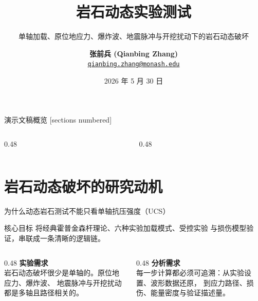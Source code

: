\documentclass[11pt,aspectratio=169]{beamer}
\title{岩石动态实验测试}
\subtitle{单轴加载、原位地应力、爆炸波、地震脉冲与开挖扰动下的岩石动态破坏\\[4pt]
\zhsub{多轴与路径相关的霍普金森杆实验}}
\date{2026 年 5 月 30 日}
\author{%
  \Large\textbf{张前兵 (Qianbing Zhang)}\\[4pt]
  {\normalsize\href{mailto:qianbing.zhang@monash.edu}{\color{TUSTteal}\nolinkurl{qianbing.zhang@monash.edu}}}
}
\institute{%
  土木与环境工程系\\
  \large\textbf{蒙纳士大学 (Monash University)}\\[8pt]
  {\tiny \color{TUSTmidgray} \copyright~2026 Qianbing Zhang. 版权所有。}
}
\begin{document}
\maketitle

\begin{frame}{演示文稿概览}
  \scriptsize
  [sections numbered]
  \begin{columns}[T,onlytextwidth]
    \begin{column}{0.48\textwidth}
      \tableofcontents[hideallsubsections,sections={1-4}]
    \end{column}
    \begin{column}{0.48\textwidth}
      \tableofcontents[hideallsubsections,sections={5-8}]
    \end{column}
  \end{columns}
\end{frame}

\section{岩石动态破坏的研究动机}

\begin{frame}{为什么动态岩石测试不能只看单轴抗压强度（UCS）}
  \begin{exampleblock}{核心目标}
    将经典霍普金森杆理论、六种实验加载模式、受控实验
    与损伤模型验证，串联成一条清晰的逻辑链。
  \end{exampleblock}
  \vspace{0.25cm}
  \begin{columns}[T,onlytextwidth]
    \begin{column}{0.48\textwidth}
      \textbf{实验需求}\\[3pt]
      岩石动态破坏很少是单轴的。原位地应力、爆炸波、
      地震脉冲与开挖扰动都是多轴且路径相关的。
    \end{column}
    \begin{column}{0.48\textwidth}
      \textbf{分析需求}\\[3pt]
      每一步计算都必须可追溯：从实验设置、波形数据还原，
      到应力路径、损伤、能量密度与验证描述量。
    \end{column}
  \end{columns}
\end{frame}
\end{document}
